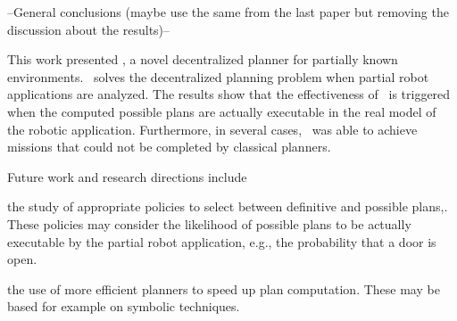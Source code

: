 --General conclusions (maybe use the same from the last paper but removing the discussion about the results)--

This work presented  \toolName, a novel decentralized planner for partially known environments.
\toolName\ solves the decentralized planning problem when partial robot applications are analyzed.
The results show that the effectiveness of \toolName\ is triggered when the computed possible plans are actually executable in the real model of the robotic application.
Furthermore, in several cases, \toolName\ was able to achieve missions that could not be completed by classical planners.

Future work and research directions include
\begin{enumerate*}
\item the study of appropriate policies to select between definitive and possible plans,.
These policies may consider the likelihood of possible plans to be actually executable by the partial robot application,  e.g.,  the probability that a door is open.
\item the use of more efficient planners to speed up plan computation.
These may be based for example on symbolic techniques.
\end{enumerate*}
